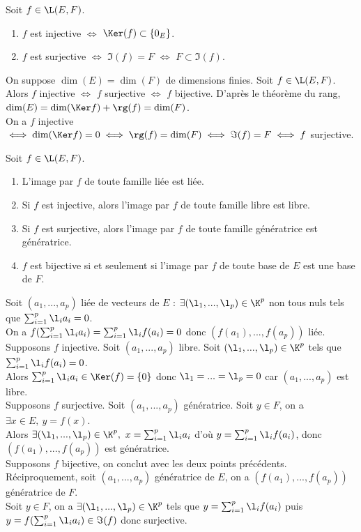 \documentclass[11pt]{article}
\begin{document}
\begin{prop}{}{}
    Soit $f\in\L(E,F)$.
    \begin{enumerate}
        \item $f$ est injective $\iff$ $\Ker(f)\subset\{0_E\}$.
        \item $f$ est surjective $\iff$ $\Im(f)=F$ $\iff$ $F\subset\Im(f)$.
    \end{enumerate}
\end{prop}

\begin{thm}{}{}
    On suppose $\dim(E)=\dim(F)$ de dimensions finies. Soit $f\in\L(E,F)$.\\
    Alors $f$ injective $\iff$ $f$ surjective $\iff$ $f$ bijective.
    \tcblower
    D'après le théorème du rang, $\dim(E)=\dim(\Ker f)+\rg(f)=\dim(F)$.\\
    On a $f$ injective $\iff \dim(\Ker f) = 0 \iff \rg(f)=\dim(F) \iff \Im(f)=F \iff f$ surjective.
\end{thm}

\begin{prop}{}{}
    Soit $f\in\L(E,F)$.
    \begin{enumerate}
        \item L'image par $f$ de toute famille liée est liée.
        \item Si $f$ est injective, alors l'image par $f$ de toute famille libre est libre.
        \item Si $f$ est surjective, alors l'image par $f$ de toute famille génératrice est génératrice.
        \item $f$ est bijective si et seulement si l'image par $f$ de toute base de $E$ est une base de $F$.
    \end{enumerate}
    \tcblower
     Soit $(a_1,...,a_p)$ liée de vecteurs de $E$ : $\exists(\l_1,...,\l_p)\in\K^p$ non tous nuls tels que $\sum_{i=1}^p\l_ia_i=0$.\\
    On a $f(\sum_{i=1}^p\l_ia_i)=\sum_{i=1}^p\l_if(a_i)=0$ donc $(f(a_1),...,f(a_p))$ liée.\\
     Supposons $f$ injective. Soit $(a_1,...,a_p)$ libre. Soit $(\l_1,...,\l_p)\in\K^p$ tels que $\sum_{i=1}^p\l_if(a_i)=0$.\\
    Alors $\sum_{i=1}^p\l_ia_i\in\Ker(f)=\{0\}$ donc $\l_1=...=\l_p=0$ car $(a_1,...,a_p)$ est libre.\\
     Supposons $f$ surjective. Soit $(a_1,...,a_p)$ génératrice. Soit $y\in F$, on a $\exists x \in E, ~ y=f(x)$.\\
    Alors $\exists(\l_1,...,\l_p)\in\K^p, ~ x=\sum_{i=1}^p\l_ia_i$ d'où $y=\sum_{i=1}^p\l_if(a_i)$, donc $(f(a_1),...,f(a_p))$ est génératrice.\\
     Supposons $f$ bijective, on conclut avec les deux points précédents.\\
    Réciproquement, soit $(a_1,...,a_p)$ génératrice de $E$, on a $(f(a_1),...,f(a_p))$ génératrice de $F$.\\
    Soit $y\in F$, on a $\exists (\l_1,...,\l_p)\in\K^p$ tels que $y=\sum_{i=1}^p\l_if(a_i)$ puis $y=f(\sum_{i=1}^p\l_ia_i)\in\Im(f)$ donc surjective.
\end{prop}
\end{document}
